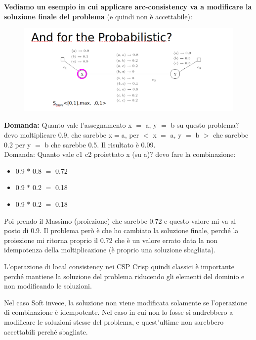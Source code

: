 \noindent \textbf{Vediamo un esempio in cui applicare arc-consistency va a modificare la soluzione finale del problema} (e quindi non è accettabile):
\begin{figure}[H]
    \centering
    \includegraphics[width=14cm, keepaspectratio]{img/Cap5/probabilistc2.png}
\end{figure}

\textbf{Domanda:} Quanto vale l'assegnamento x $=$ a, y $=$ b su questo problema?
\\devo moltiplicare 0.9, che sarebbe x$=$a, per $<$ x $=$ a, y $=$ b $>$ che sarebbe 0.2 per y $=$ b che sarebbe 0.5. Il risultato è 0.09.
\\Domanda: Quanto vale c1 c2 proiettato x (su a)? devo fare la combinazione:
\begin{itemize}
    \item 0.9 $*$ 0.8 $=$ 0.72
    \item 0.9 $*$ 0.2 $=$ 0.18
    \item 0.9 $*$ 0.2 $=$ 0.18
\end{itemize}
Poi prendo il Massimo (proiezione) che sarebbe 0.72 e questo valore mi va al posto di 0.9. Il problema però è che ho cambiato la soluzione finale, perché la proiezione mi ritorna proprio il 0.72 che è un valore errato data la non idempotenza della moltiplicazione (è proprio una soluzione sbagliata).

\vspace{0.8cm}

\noindent L'operazione di local consistency nei CSP Crisp quindi classici è importante perché mantiene la soluzione del problema riducendo gli elementi del dominio e non modificando le soluzioni.

\vspace{0.5cm}

\noindent Nel caso Soft invece, la soluzione non viene modificata solamente se l'operazione di combinazione è idempotente. Nel caso in cui non lo fosse si andrebbero a modificare le soluzioni stesse del problema, e quest'ultime non sarebbero accettabili perché sbagliate.

